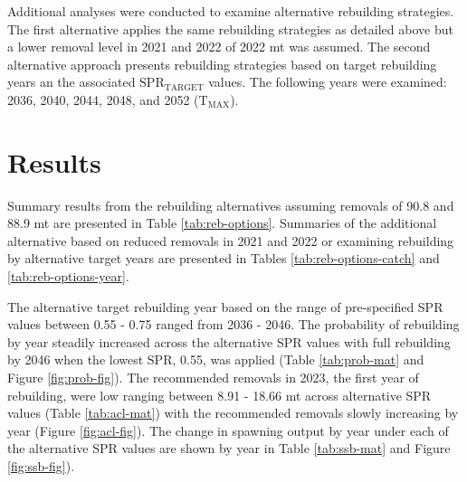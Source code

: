\documentclass[11pt,
  english,
  a4paper,
]{article}
\begin{document}
Additional analyses were conducted to examine alternative rebuilding strategies. The first alternative applies the same rebuilding strategies as detailed above but a lower removal level in 2021 and 2022 of 2022 mt was assumed. The second alternative approach presents rebuilding strategies based on target rebuilding years an the associated {\(\text{SPR}_\text{TARGET}\)\leavevmode\tagmcend\tagstructend} values. The following years were examined: 2036, 2040, 2044, 2048, and 2052 ({\(\text{T}_\text{MAX}\)\leavevmode\tagmcend\tagstructend}).

\leavevmode\tagmcend\tagstructend\par


\hypertarget{results}{%
\section{Results}\label{results}}

\leavevmode\tagmcend\tagstructend


Summary results from the rebuilding alternatives assuming removals of 90.8 and 88.9 mt are presented in Table \ref{tab:reb-options}. Summaries of the additional alternative based on reduced removals in 2021 and 2022 or examining rebuilding by alternative target years are presented in Tables \ref{tab:reb-options-catch} and \ref{tab:reb-options-year}.

\leavevmode\tagmcend\tagstructend\par


The alternative target rebuilding year based on the range of pre-specified SPR values between 0.55 - 0.75 ranged from 2036 - 2046. The probability of rebuilding by year steadily increased across the alternative SPR values with full rebuilding by 2046 when the lowest SPR, 0.55, was applied (Table \ref{tab:prob-mat} and Figure \ref{fig:prob-fig}). The recommended removals in 2023, the first year of rebuilding, were low ranging between 8.91 - 18.66 mt across alternative SPR values (Table \ref{tab:acl-mat}) with the recommended removals slowly increasing by year (Figure \ref{fig:acl-fig}). The change in spawning output by year under each of the alternative SPR values are shown by year in Table \ref{tab:ssb-mat} and Figure \ref{fig:ssb-fig}).
\end{document}
